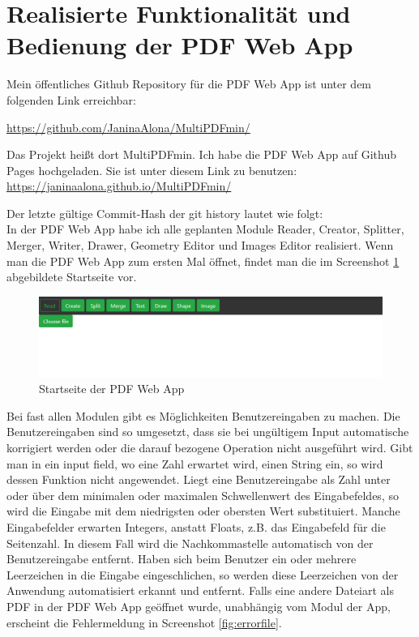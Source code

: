 \section{Realisierte Funktionalität und Bedienung der PDF Web App}
Mein öffentliches Github Repository für die PDF Web App ist unter dem folgenden Link erreichbar: 

\url{https://github.com/JaninaAlona/MultiPDFmin/}

Das Projekt heißt dort MultiPDFmin. Ich habe die PDF Web App auf Github Pages hochgeladen. Sie ist unter diesem Link zu benutzen:
\url{https://janinaalona.github.io/MultiPDFmin/}

Der letzte gültige Commit-Hash der git history lautet wie folgt: \\


In der PDF Web App habe ich alle geplanten Module Reader, Creator, Splitter, Merger, Writer, Drawer, Geometry Editor und Images Editor realisiert. Wenn man die PDF Web App zum ersten Mal öffnet, findet man die im Screenshot \ref{fig:start} abgebildete Startseite vor.

\begin{figure}[!htbp]
	\centering
	\includegraphics[width=1\textwidth]{"images/startseite.png"}
	\caption{Startseite der PDF Web App}
	\label{fig:start}
\end{figure}

Bei fast allen Modulen gibt es Möglichkeiten Benutzereingaben zu machen. Die Benutzereingaben sind so umgesetzt, dass sie bei ungültigem Input automatische korrigiert werden oder die darauf bezogene Operation nicht ausgeführt wird. Gibt man in ein input field, wo eine Zahl erwartet wird, einen String ein, so wird dessen Funktion nicht angewendet. Liegt eine Benutzereingabe als Zahl unter oder über dem minimalen oder maximalen Schwellenwert des Eingabefeldes, so wird die Eingabe mit dem niedrigsten oder obersten Wert substituiert. Manche Eingabefelder erwarten Integers, anstatt Floats, z.B. das Eingabefeld für die Seitenzahl. In diesem Fall wird die Nachkommastelle automatisch von der Benutzereingabe entfernt. Haben sich beim Benutzer ein oder mehrere Leerzeichen in die Eingabe eingeschlichen, so werden diese Leerzeichen von der Anwendung automatisiert erkannt und entfernt. Falls eine andere Dateiart als PDF in der PDF Web App geöffnet wurde, unabhängig vom Modul der App, erscheint die Fehlermeldung in Screenshot \ref{fig:errorfile}. 

